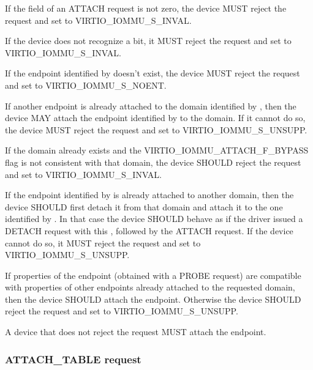 
If the  field of an ATTACH request is not zero, the device
MUST reject the request and set  to VIRTIO_IOMMU_S_INVAL.

If the device does not recognize a  bit, it MUST
reject the request and set  to
VIRTIO_IOMMU_S_INVAL.

If the endpoint identified by  doesn't exist, the device
MUST reject the request and set  to VIRTIO_IOMMU_S_NOENT.

If another endpoint is already attached to the domain identified by
, then the device MAY attach the endpoint identified by
 to the domain. If it cannot do so, the device MUST reject
the request and set  to VIRTIO_IOMMU_S_UNSUPP.

If the domain already exists and the VIRTIO_IOMMU_ATTACH_F_BYPASS
flag is not consistent with that domain, the device SHOULD reject
the request and set  to VIRTIO_IOMMU_S_INVAL.

If the endpoint identified by  is already attached to
another domain, then the device SHOULD first detach it from that domain
and attach it to the one identified by . In that case the
device SHOULD behave as if the driver issued a DETACH request with this
, followed by the ATTACH request. If the device cannot do
so, it MUST reject the request and set  to
VIRTIO_IOMMU_S_UNSUPP.

If properties of the endpoint (obtained with a PROBE request) are
compatible with properties of other endpoints already attached to the
requested domain, then the device SHOULD attach the endpoint. Otherwise
the device SHOULD reject the request and set  to
VIRTIO_IOMMU_S_UNSUPP.

A device that does not reject the request MUST attach the endpoint.

\subsubsection{ATTACH_TABLE request}\label{ref:Device Types / IOMMU Device / Device operations / ATTACH_TABLE request}

